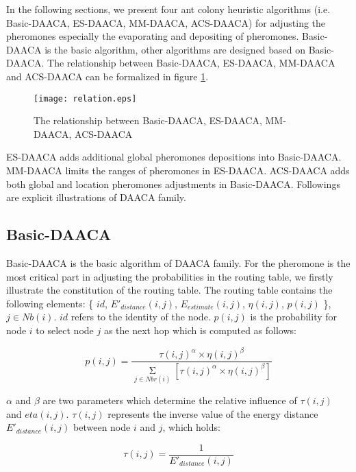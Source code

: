 \documentclass{elsarticle}
\DeclareMathOperator*{\SIGMA}{\Sigma}
\begin{document}
In the following sections, we present four ant colony heuristic algorithms (i.e. Basic-DAACA, ES-DAACA, MM-DAACA, ACS-DAACA) for adjusting the pheromones especially the evaporating and depositing of pheromones. Basic-DAACA is the basic algorithm, other algorithms are designed based on Basic-DAACA. The relationship between Basic-DAACA, ES-DAACA, MM-DAACA and ACS-DAACA can be formalized in figure \ref{fig:relation}.

\begin{figure}
\centering
\texttt{[image: relation.eps]}\\
  \caption{The relationship between Basic-DAACA, ES-DAACA, MM-DAACA, ACS-DAACA}\label{fig:relation}
\end{figure}

ES-DAACA adds additional global pheromones depositions into Basic-DAACA. MM-DAACA limits the ranges of pheromones in ES-DAACA. ACS-DAACA adds both global and location pheromones adjustments in Basic-DAACA. Followings are explicit illustrations of DAACA family.


\subsection{Basic-DAACA} \label{BasicDAACA}
Basic-DAACA is the basic algorithm of DAACA family. For the pheromone is the most critical part in adjusting the probabilities in the routing table, we firstly illustrate the constitution of the routing table. The routing table contains the following elements: \{ $id$, $E'_{distance}(i,j)$, $E_{estimate}(i,j)$, $\eta(i,j)$, $p(i,j)$ \}, $j\in Nb(i)$. $id$ refers to the identity of the node. $p(i,j)$ is the probability for node $i$ to select node $j$ as the next hop which is computed as follows:

\begin{equation} \label{e1}
p(i,j)= \frac{{\tau(i,j)}^{\alpha} \times {\eta(i,j)}^{\beta}}{
\SIGMA \limits_{j \in Nbr(i)}
[{\tau(i,j)}^{\alpha} \times {\eta(i,j)}^{\beta}]}
\end{equation}

$\alpha$ and $\beta$ are two parameters which determine the relative influence of $\tau(i,j)$ and $eta(i,j)$. $\tau(i,j)$ represents the inverse value of the energy distance $E'_{distance}(i,j)$ between node $i$ and $j$, which holds:

\begin{equation}
\tau(i,j)= \frac{1}{E'_{distance}(i,j)}
\end{equation}
\end{document}
